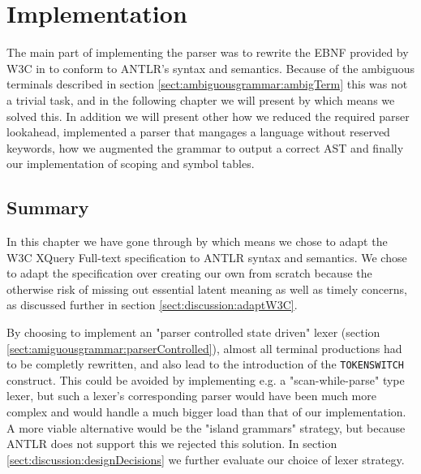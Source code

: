 \chapter{Implementation}
\label{chapter:implementation}

The main part of implementing the parser was to rewrite the EBNF provided by W3C in \cite{w3c01} to conform to ANTLR's syntax and semantics. Because of the ambiguous terminals described in section \ref{sect:ambiguousgrammar:ambigTerm} this was not a trivial task, and in the following chapter we will present by which means we solved this. In addition we will present other how we reduced the required parser lookahead, implemented a parser that mangages a language without reserved keywords, how we augmented the grammar to output a correct AST and finally our implementation of scoping and symbol tables.















\section{Summary}
In this chapter we have gone through by which means we chose to adapt the W3C
XQuery Full-text specification to ANTLR syntax and semantics. We chose to adapt
the specification over creating our own from scratch because the otherwise risk
of missing out essential latent meaning as well as timely concerns, as
discussed further in section \ref{sect:discussion:adaptW3C}.    

By choosing to implement an "parser controlled state driven" lexer (section
\ref{sect:amiguousgrammar:parserControlled}), almost all terminal productions
had to be completly rewritten, and also lead to the introduction of the
\verb!TOKENSWITCH! construct. This could be avoided by implementing e.g. a
"scan-while-parse" type lexer, but such a lexer's corresponding parser would
have been much more complex and would handle a much bigger load than that of
our implementation. A more viable alternative would be the "island grammars"
strategy, but because ANTLR does not support this we rejected this solution. In
section \ref{sect:discussion:designDecisions} we further evaluate our choice of
lexer strategy.         

